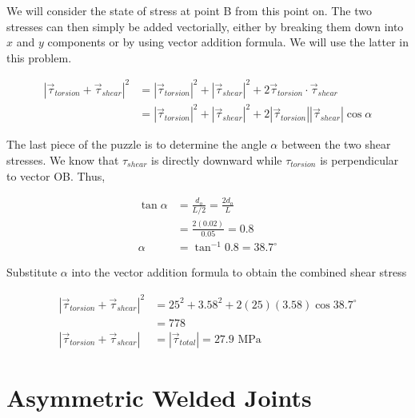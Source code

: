 \documentclass[
10pt,
a4paper,
openany,
svgnames,
]{book}
\begin{document}
\begin{solution}
  We will consider the state of stress at point B from this point on. The two stresses can then simply be added vectorially, either by breaking them down into $x$ and $y$ components or by using vector addition formula. We will use the latter in this problem.

  \begin{align*}
    \left| \vec{\tau}_{torsion} + \vec{\tau}_{shear} \right|^2 &= \left| \vec{\tau}_{torsion} \right|^2 + \left| \vec{\tau}_{shear} \right|^2 + 2 \vec{\tau}_{torsion} \cdot \vec{\tau}_{shear} \\
                                                               &= \left| \vec{\tau}_{torsion} \right|^2 + \left| \vec{\tau}_{shear} \right|^2 + 2 \left| \vec{\tau}_{torsion} \right| \left| \vec{\tau}_{shear} \right| \cos \alpha
  \end{align*}

  The last piece of the puzzle is to determine the angle $\alpha$ between the two shear stresses. We know that $\tau_{shear}$ is directly downward while $\tau_{torsion}$ is perpendicular to vector OB. Thus,

  \begin{align*}
    \tan \alpha &= \frac{d_o}{L/2} = \frac{2 d_o}{L} \\
                &= \frac{2(0.02)}{0.05} = 0.8 \\
    \alpha &= \tan^{-1} 0.8 = 38.7^{\circ}
  \end{align*}

  Substitute $\alpha$ into the vector addition formula to obtain the combined shear stress

  \begin{align*}
    \left| \vec{\tau}_{torsion} + \vec{\tau}_{shear} \right|^2 &= 25^2 + 3.58^2 + 2(25)(3.58) \cos 38.7^{\circ} \\
                                                               &= 778 \\
    \left| \vec{\tau}_{torsion} + \vec{\tau}_{shear} \right| &= \left| \vec{\tau}_{total} \right| = 27.9 \text{ MPa}                                                        
  \end{align*}
  
\end{solution}

\section{Asymmetric Welded Joints}
\end{document}

